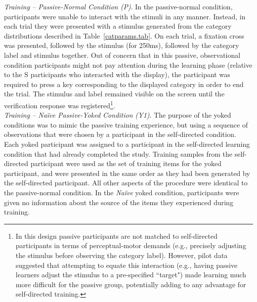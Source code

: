 \documentclass[3p,twocolumn,authoryear,10pt]{elsarticle}
\begin{document}
\noindent
\textit{Training -- Passive-Normal Condition (P)}.  In the passive-normal condition, participants were unable to interact with the stimuli in any manner. Instead, in each trial they were presented with a stimulus generated from the category distributions described in Table~\ref{catparams.tab}. On each trial, a fixation cross was presented, followed by the stimulus (for 250ms), followed by the category label and stimulus together.  Out of concern that in this passive, observational condition participants might not pay attention during the learning phase (relative to the S participants who interacted with the display), the participant was required to press a key corresponding to the displayed category in order to end the trial.  The stimulus and label remained visible on the screen until the verification response was registered\footnote{In this design passive participants are not matched to self-directed participants in terms of perceptual-motor demands (e.g., precisely  adjusting the stimulus before observing the category label). However, pilot data suggested that attempting to equate this interaction (e.g., having passive learners adjust the stimulus to a pre-specified ``target") made learning much more difficult for the passive group, potentially adding to any advantage for self-directed training.}.\\

\noindent
\textit{Training -- Na\"{i}ve Passive-Yoked Condition (Y1)}. The purpose of the yoked conditions was to mimic the passive training experience, but using a sequence of observations that were chosen by a participant in the self-directed condition. Each yoked participant was assigned to a participant in the self-directed learning condition that had already completed the study. Training samples from the self-directed participant were used as the set of training items for the yoked participant, and were presented in the same order as they had been generated by the self-directed participant. All other aspects of the procedure were identical to the passive-normal condition. In the \textit{Na\"ive} yoked condition, participants were given no information about the source of the items they experienced during training. \\
\end{document}

